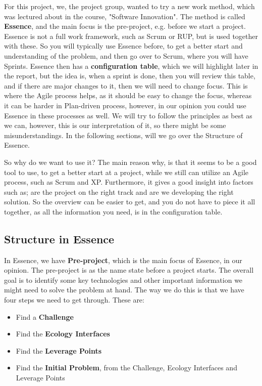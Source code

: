 For this project, we, the project group, wanted to try a new work method, which was lectured about in the course, "Software Innovation".
The method is called \textbf{Essence}, and the main focus is the pre-project, e.g. before we start a project.
Essence is not a full work framework, such as Scrum or RUP, but is used together with these.
So you will typically use Essence before, to get a better start and understanding of the problem, and then go over to Scrum, where you will have Sprints. 
Essence then has a \textbf{configuration table}, which we will highlight later in the report, but the idea is, when a sprint is done, then you will review this table, and if there are major changes to it, then we will need to change focus.
This is where the Agile process helps, as it should be easy to change the focus, whereas it can be harder in Plan-driven process, however, in our opinion you could use Essence in these processes as well. 
We will try to follow the principles as best as we can, however, this is our interpretation of it, so there might be some misunderstandings.
In the following sections, will we go over the Structure of Essence.

So why do we want to use it?
The main reason why, is that it seems to be a good tool to use, to get a better start at a project, while we still can utilize an Agile process, such as Scrum and XP.
Furthermore, it gives a good insight into factors such as; are the project on the right track and are we developing the right solution.
So the overview can be easier to get, and you do not have to piece it all together, as all the information you need, is in the configuration table.

\subsection{Structure in Essence}
In Essence, we have \textbf{Pre-project}, which is the main focus of Essence, in our opinion.
The pre-project is as the name state before a project starts. 
The overall goal is to identify some key technologies and other important information we might need to solve the problem at hand.
The way we do this is that we have four steps we need to get through.
These are:

\begin{itemize}
    \item Find a \textbf{Challenge}
    \item Find the \textbf{Ecology Interfaces}
    \item Find the \textbf{Leverage Points}
    \item Find the \textbf{Initial Problem}, from the Challenge, Ecology Interfaces and Leverage Points
\end{itemize}

